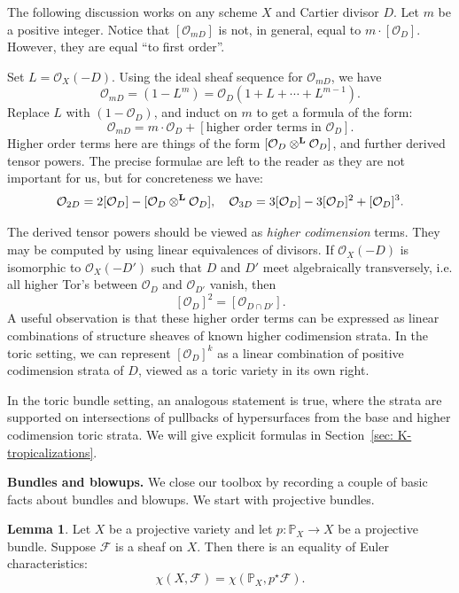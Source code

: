 \documentclass[11pt]{amsart}
\theoremstyle{definition}
\theoremstyle{definition}
\newtheorem{lemma}[theorem]{Lemma}
\begin{document}
The following discussion works on any scheme $X$ and Cartier divisor $D$. Let $m$ be a positive integer. Notice that $[\mathcal O_{mD}]$ is not, in general, equal to $m\cdot [\mathcal O_{D}]$. However, they are equal ``to first order''. 

Set $L = \mathcal O_X(-D)$. Using the ideal sheaf sequence for $\mathcal O_{mD}$, we have
\[
\mathcal O_{mD} = (1- L^m) = \mathcal O_D(1+L+\cdots+L^{m-1}). 
\]
Replace $L$ with $(1-\mathcal O_D)$, and induct on $m$ to get a formula of the form:
\[
\mathcal O_{mD}  = m\cdot \mathcal O_{D}+[\text{higher order terms in } \mathcal O_D].
\]
Higher order terms here are things of the form $[\mathcal O_D\otimes^{\bf L}\mathcal O_D]$, and further derived tensor powers. The precise formulae are left to the reader as they are not important for us, but for concreteness we have:
\[
\mathcal O_{2D} = 2[\mathcal O_D]-[\mathcal O_D\otimes^{\bf L}\mathcal O_D], \ \ \ \mathcal O_{3D} = 3[\mathcal O_D]-3[\mathcal O_D]^2+[\mathcal O_D]^3.
\]

The derived tensor powers should be viewed as {\it higher codimension} terms. They may be computed by using linear equivalences of divisors. If $\mathcal O_X(-D)$ is isomorphic to $\mathcal O_X(-D')$ such that $D$ and $D'$ meet algebraically transversely, i.e. all higher Tor's between $\mathcal O_D$ and $\mathcal O_{D'}$ vanish, then
\[
[\mathcal O_D]^2 = [\mathcal O_{D\cap D'}].
\]
A useful observation is that these higher order terms can be expressed as linear combinations of structure sheaves of known higher codimension strata. In the toric setting, we can represent $[\mathcal O_D]^k$ as a linear combination of positive  codimension strata of $D$, viewed as a toric variety in its own right. 

In the toric bundle setting, an analogous statement is true, where the strata are supported on intersections of pullbacks of hypersurfaces from the base and higher codimension toric strata. We will give explicit formulas in Section~\ref{sec: K-tropicalizations}.

\noindent
{\bf Bundles and blowups.} We close our toolbox by recording a couple of basic facts about bundles and blowups. We start with projective bundles.

\begin{lemma}
Let $X$ be a projective variety and let $p\colon \mathbb P_X\to X$ be a projective bundle. Suppose $\mathcal F$ is a sheaf on $X$. Then there is an equality of Euler characteristics:
\[
\chi(X,\mathcal F) = \chi(\mathbb P_X,p^\star\mathcal F). 
\]
\end{lemma}
\end{document}
